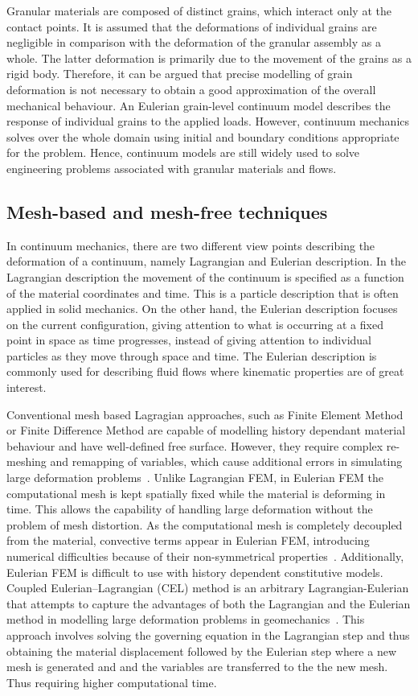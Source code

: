 Granular materials are composed of distinct grains, which interact only at 
the contact points. It is assumed that the deformations of individual grains 
are negligible in comparison with the deformation of the granular assembly as 
a whole. The latter deformation is primarily due to the movement of the grains 
as a rigid body. Therefore, it can be argued that precise modelling of grain 
deformation is not necessary to obtain a good approximation of the overall 
mechanical behaviour. An Eulerian grain-level continuum model describes the 
response of individual grains to the applied loads. However, continuum 
mechanics solves over the whole domain using initial and boundary conditions 
appropriate for the problem. Hence, continuum models are still widely used to 
solve engineering problems associated with granular materials and flows.

\subsection{Mesh-based and mesh-free techniques}

In continuum mechanics, there are two different view points describing the 
deformation of a continuum, namely Lagrangian and Eulerian 
description. In the Lagrangian description  the movement of the continuum is 
specified as a function of the material coordinates and time. This is a 
particle description that is often applied in solid mechanics. On the other 
hand, the Eulerian description focuses on the current configuration, giving 
attention to what is occurring at a fixed point in space as time progresses, 
instead of giving attention to individual particles as they move through space 
and time. The Eulerian description is commonly used for describing fluid flows 
where kinematic properties are of great interest. 

Conventional mesh based Lagragian approaches, such as Finite Element Method or 
Finite Difference Method are capable of modelling history dependant material 
behaviour and have well-defined free surface. However, they require complex 
re-meshing and remapping of variables, which cause additional errors in 
simulating large deformation problems~\citep{Li2002}. Unlike Lagrangian FEM, 
in Eulerian FEM the computational mesh is kept spatially fixed while the 
material is deforming in time. This allows the capability of handling large 
deformation without the problem of mesh distortion. As the computational mesh 
is completely decoupled from the material, convective terms appear in Eulerian 
FEM, introducing numerical difficulties because of their non-symmetrical 
properties~\citep{Donea1982}. Additionally, Eulerian FEM is difficult to use
with history dependent constitutive models. Coupled Eulerian–Lagrangian (CEL) 
method is an arbitrary Lagrangian-Eulerian that attempts to capture the 
advantages of both the Lagrangian and the Eulerian method in modelling large 
deformation problems in geomechanics~\citep{Qiu2011}. This approach involves 
solving the governing equation in the Lagrangian step and thus obtaining the 
material displacement followed by the Eulerian step where a new mesh is 
generated and and the variables are transferred to the the new mesh. Thus 
requiring higher computational time. 

